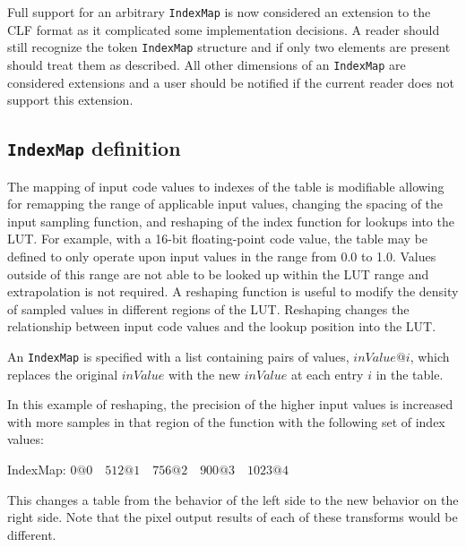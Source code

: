 \label{appendixC}

Full support for an arbitrary \texttt{IndexMap} is now considered an extension to the CLF format as it complicated some implementation decisions. A reader should still recognize the token \texttt{IndexMap} structure and if only two elements are present should treat them as described. All other dimensions of an \texttt{IndexMap} are considered extensions and a user should be notified if the current reader does not support this extension.

\subsection*{\texttt{IndexMap} definition}
The mapping of input code values to indexes of the table is modifiable allowing for remapping the range of applicable input values, changing the spacing of the input sampling function, and reshaping of the index function for lookups into the LUT. For example, with a 16-bit floating-point code value, the table may be defined to only operate upon input values in the range from 0.0 to 1.0. Values outside of this range are not able to be looked up within the LUT range and extrapolation is not required. A reshaping function is useful to modify the density of sampled values in different regions of the LUT. Reshaping changes the relationship between input code values and the lookup position into the LUT.
  
An \texttt{IndexMap} is specified with a list containing pairs of values,  $inValue@i$, which replaces the original $inValue$ with the new $inValue$ at each entry $i$ in the table.

In this example of reshaping, the precision of the higher input values is increased with more samples in that region of the function with the following set of index values:

IndexMap:   $0@0 \quad 512@1 \quad 756@2 \quad 900@3 \quad 1023@4$

This changes a table from the behavior of the left side to the new behavior on the right side. Note that the pixel output results of each of these transforms would be different.

